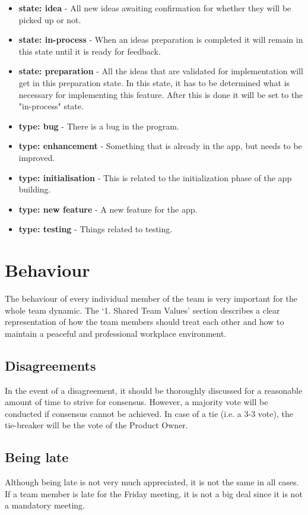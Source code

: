 \documentclass[sigconf,nonacm]{acmart}
\begin{document}
\begin{itemize}
    \item \textbf{state: idea}          - All new ideas awaiting confirmation for whether they will be picked up or not.
    \item \textbf{state: in-process}    - When an ideas preparation is completed it will remain in this state until it is ready for feedback.
    \item \textbf{state: preparation}   - All the ideas that are validated for implementation will get in this preparation state. In this state, it has to be determined what is necessary for implementing this feature. After this is done it will be set to the "in-process" state.
    \item \textbf{type: bug}            - There is a bug in the program.          
    \item \textbf{type: enhancement}    - Something that is already in the app, but needs to be improved.
    \item \textbf{type: initialisation} - This is related to the initialization phase of the app building.
    \item \textbf{type: new feature}    - A new feature for the app.
    \item \textbf{type: testing}        - Things related to testing.
\end{itemize}


\section{Behaviour}
The behaviour of every individual member of the team is very important for the whole team dynamic. The ‘1. Shared Team Values’ section describes a clear representation of how the team members should treat each other and how to maintain a peaceful and professional workplace environment.

\subsection{Disagreements}
In the event of a disagreement, it should be thoroughly discussed for a reasonable amount of time to strive for consensus. However, a majority vote will be conducted if consensus cannot be achieved. In case of a tie (i.e. a 3-3 vote), the tie-breaker will be the vote of the Product Owner.

\subsection{Being late}
Although being late is not very much appreciated, it is not the same in all cases. If a team member is late for the Friday meeting, it is not a big deal since it is not a mandatory meeting.
\end{document}
